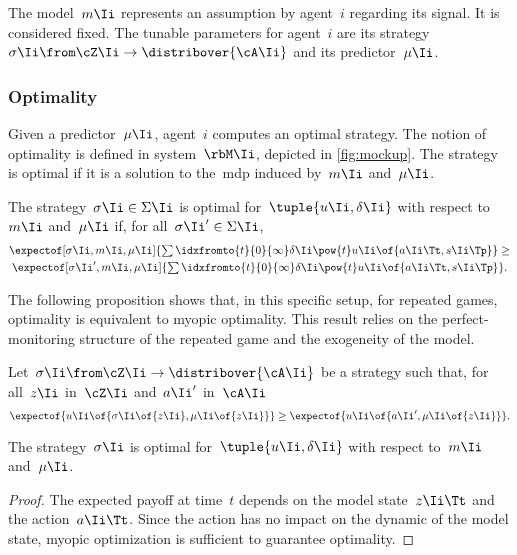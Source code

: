 The model~\(m\Ii\) represents an assumption by agent~\(i\) regarding its signal.
It is considered fixed.
The tunable parameters for agent~\(i\) are its strategy~\(\sigma\Ii \from \cZ\Ii \to \distribover{\cA\Ii}\) and its predictor~\(\mu\Ii\).

\subsubsection{Optimality}

Given a predictor~\(\mu\Ii\), agent~\(i\) computes an optimal strategy.
The notion of optimality is defined in system~\(\rbM\Ii\), depicted in \cref{fig:mockup}.
The strategy is optimal if it is a solution to the~\ac{mdp} induced by~\(m\Ii\) and~\(\mu\Ii\).

\begin{definition}[Optimality]
The strategy~\(\sigma\Ii \in \Sigma\Ii\) is optimal for~\(\tuple{u\Ii, \delta\Ii}\) with respect to~\(m\Ii\) and~\(\mu\Ii\) if, for all~\(\sigma\Ii' \in \Sigma\Ii\),
\begin{multline*}
\textstyle
\expectof[\sigma\Ii, m\Ii, \mu\Ii]{\sum\idxfromto{t}{0}{\infty} \delta\Ii\pow{t} u\Ii \of{a\Ii\Tt, s\Ii\Tp}}
\geq \\
\textstyle
\expectof[\sigma\Ii', m\Ii, \mu\Ii]{\sum\idxfromto{t}{0}{\infty} \delta\Ii\pow{t} u\Ii \of{a\Ii\Tt, s\Ii\Tp}}
.
\end{multline*}
\end{definition}

The following proposition shows that, in this specific setup, for repeated games, optimality is equivalent to myopic optimality.
This result relies on the perfect-monitoring structure of the repeated game and the exogeneity of the model.

\begin{proposition}
\label{res:myopic_optimality}
Let~\(\sigma\Ii \from \cZ\Ii \to \distribover{\cA\Ii}\) be a strategy such that, for all~\(z\Ii\) in~\(\cZ\Ii\) and~\(a\Ii'\) in~\(\cA\Ii\)
\[
\expectof{u\Ii \of{\sigma\Ii \of{z\Ii}, \mu\Ii \of{z\Ii}}}
\ge
\expectof{u\Ii \of{a\Ii', \mu\Ii \of{z\Ii}}}
.
\]

The strategy~\(\sigma\Ii\) is optimal for~\(\tuple{u\Ii, \delta\Ii}\) with respect to~\(m\Ii\) and~\(\mu\Ii\).
\end{proposition}

\begin{proof}
The expected payoff at time~\(t\) depends on the model state~\(z\Ii\Tt\) and the action~\(a\Ii\Tt\).
Since the action has no impact on the dynamic of the model state, myopic optimization is sufficient to guarantee optimality.
\end{proof}

